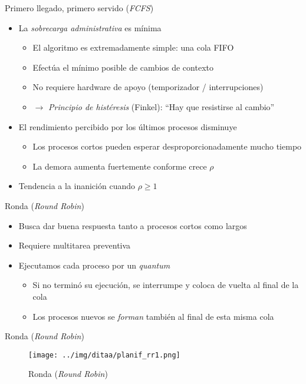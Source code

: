 \documentclass[presentation]{beamer}
\begin{document}
\begin{frame}[label={sec:org5206a6b}]{Primero llegado, primero servido (\emph{FCFS})}
\begin{itemize}
\item La \emph{sobrecarga administrativa} es mínima
\begin{itemize}
\item El algoritmo es extremadamente simple: una cola FIFO
\item Efectúa el mínimo posible de cambios de contexto
\item No requiere hardware de apoyo (temporizador / interrupciones)
\item \(\rightarrow\) \emph{Principio de histéresis} (Finkel): ``Hay que
resistirse al cambio''
\end{itemize}

\item El rendimiento percibido por los últimos procesos disminuye
\begin{itemize}
\item Los procesos cortos pueden esperar desproporcionadamente mucho
tiempo
\item La demora aumenta fuertemente conforme crece \(\rho\)
\end{itemize}
\item Tendencia a la inanición cuando \(\rho \ge 1\)
\end{itemize}
\end{frame}

\begin{frame}[label={sec:org524874e}]{Ronda (\emph{Round Robin})}
\begin{itemize}
\item Busca dar buena respuesta tanto a procesos cortos como largos
\item Requiere multitarea preventiva
\item Ejecutamos cada proceso por un \emph{quantum}
\begin{itemize}
\item Si no terminó su ejecución, se interrumpe y coloca de vuelta al
final de la cola
\item Los procesos nuevos se \emph{forman} también al final de esta misma
cola
\end{itemize}
\end{itemize}
\end{frame}
\begin{frame}[label={sec:org366de40}]{Ronda (\emph{Round Robin})}
\begin{figure}[htbp]
\centering
\texttt{[image: ../img/ditaa/planif\_rr1.png]}
\caption{Ronda (\emph{Round Robin})}
\end{figure}
\end{frame}
\end{document}
